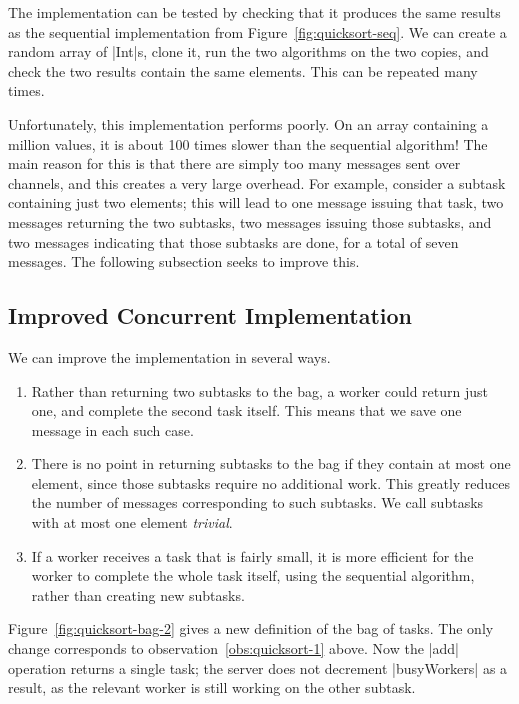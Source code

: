 
The implementation can be tested by checking that it produces the same results
as the sequential implementation from Figure~\ref{fig:quicksort-seq}.  We can
create a random array of |Int|s, clone it, run the two algorithms on the two
copies, and check the two results contain the same elements.  This can be
repeated many times.

Unfortunately, this implementation performs poorly.  On an array containing a
million values, it is about 100 times slower than the sequential algorithm!
The main reason for this is that there are simply too many messages sent over
channels, and this creates a very large overhead.  For example, consider a
subtask containing just two elements; this will lead to one message issuing
that task, two messages returning the two subtasks, two messages issuing those
subtasks, and two messages indicating that those subtasks are done, for a
total of seven messages.  The following subsection seeks to improve this.



\subsection{Improved Concurrent Implementation} 

We can improve the implementation in several ways.
%
\begin{enumerate}
\item \label{obs:quicksort-1}
  Rather than returning two subtasks to the bag, a worker could return
  just one, and complete the second task itself.  This means that we save one
  message in each such case.

\item There is no point in returning subtasks to the bag if they contain at
  most one element, since those subtasks require no additional work.  This
  greatly reduces the number of messages corresponding to such subtasks.  We
  call subtasks with at most one element \emph{trivial}. 

\item\label{obs:quicksort-3} If a worker receives a task that is fairly small,
  it is more efficient for the worker to complete the whole task itself, using
  the sequential algorithm, rather than creating new subtasks.
\end{enumerate}

Figure~\ref{fig:quicksort-bag-2} gives a new definition of the bag of tasks.
The only change corresponds to observation~\ref{obs:quicksort-1} above.  Now
the |add| operation returns a single task; the server does not decrement
|busyWorkers| as a result, as the relevant worker is still working on the
other subtask. 


